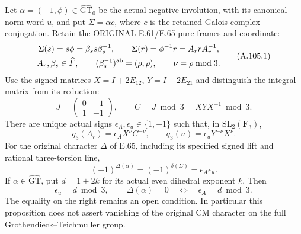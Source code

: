 Let \(\alpha=(-1,\phi)\in\widehat{\mathrm{GT}}_0\) be the actual
negative involution, with its canonical norm word \(u\), and put
\(\Sigma=\alpha c\), where \(c\) is the retained Galois complex
conjugation. Retain the ORIGINAL E.61/E.65 pure frames and coordinate:
\[
\begin{gathered}
 \Sigma(s)=s\phi=\beta_s s\beta_s^{-1},\qquad
 \Sigma(r)=\phi^{-1}r=A_r rA_r^{-1},\\
 A_r,\beta_s\in\widehat F,\qquad
 (\beta_s^{-1})^{\rm ab}=(\rho,\rho),\qquad \nu=\rho\bmod3.
\end{gathered}
\tag{A.105.1}
\]
Use the signed matrices \(X=I+2E_{12}\), \(Y=I-2E_{21}\) and
distinguish the integral matrix from its reduction:
\[
 J=\begin{pmatrix}0&-1\\1&-1\end{pmatrix},\qquad
 C=J\bmod3=XYX^{-1}\bmod3.
\tag{A.105.2}
\]
There are unique actual signs \(\epsilon_A,\epsilon_u\in\{1,-1\}\)
such that, in \(\mathrm{SL}_2(\mathbf F_3)\),
\[
 q_3(A_r)=\epsilon_A X^\nu C^{-\nu},\qquad
 q_3(u)=\epsilon_uY^{-\nu}X^\nu.
\tag{A.105.3}
\]
For the original character \(\Delta\) of E.65, including its
specified signed lift and rational three-torsion line,
\[
 \boxed{\,(-1)^{\Delta(\alpha)}
       =(-1)^{\delta(\Sigma)}=\epsilon_A\epsilon_u.\,}
\tag{A.105.4}
\]
If \(\alpha\in\widehat{\mathrm{GT}}\), put
\(d=1+2k\) for its actual even dihedral exponent \(k\). Then
\[
 \epsilon_u=d\bmod3,\qquad
 \boxed{\,\Delta(\alpha)=0
       \quad\Longleftrightarrow\quad \epsilon_A=d\bmod3.\,}
\tag{A.105.5}
\]
The equality on the right remains an open condition. In particular
this proposition does not assert vanishing of the original CM
character on the full Grothendieck--Teichmuller group.

